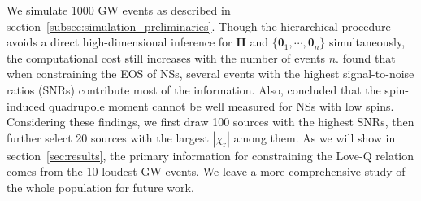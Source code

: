 \documentclass[a4paper,11pt]{article}
\begin{document}
We simulate 1000 GW events as described in
section~\ref{subsec:simulation_preliminaries}.  Though the hierarchical
procedure avoids a direct high-dimensional inference for $\bm{H}$ and
$\{\bm{\theta}_1,\cdots,\bm{\theta}_n\}$ simultaneously, the computational cost
still increases with the number of events $n$.  \citet{Lackey:2014fwa} found
that when constraining the EOS of NSs, several events with the highest
signal-to-noise ratios (SNRs) contribute most of the information. Also,
\citet{Yagi:2013awa} concluded that the spin-induced quadrupole moment cannot be
well measured for NSs with low spins. Considering these findings, we first draw
100 sources with the highest SNRs, then further select 20 sources with the
largest $|\chi_{\mathrm{r}}|$ among them. As we will show in
section~\ref{sec:results}, the primary information for constraining the Love-Q
relation comes from the 10 loudest GW events. We leave a more comprehensive
study of the whole population for future work. 
\end{document}
